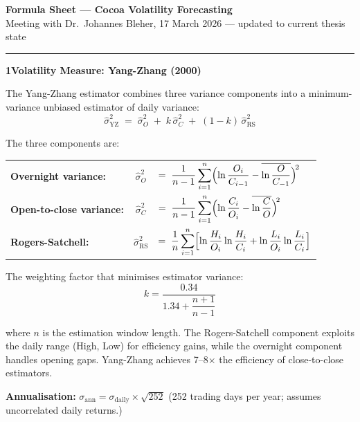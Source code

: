 \documentclass[10pt,a4paper]{article}
\newcommand{\sectionrule}{\vspace{0.3em}\hrule\vspace{0.5em}}
\begin{document}
\begin{center}
{\Large\bfseries Formula Sheet --- Cocoa Volatility Forecasting}\\[0.3em]
{\normalsize Meeting with Dr.\ Johannes Bleher, 17 March 2026 --- updated to current thesis state}
\end{center}

\sectionrule

\textbf{1\quad Volatility Measure: Yang-Zhang (2000)}

The Yang-Zhang estimator combines three variance components into a
minimum-variance unbiased estimator of daily variance:
\begin{equation*}
\hat{\sigma}^2_{\text{YZ}} \;=\; \hat{\sigma}^2_O \;+\; k\,\hat{\sigma}^2_C \;+\; (1-k)\,\hat{\sigma}^2_{\text{RS}}
\end{equation*}

The three components are:

\begin{tabular}{@{}lcl@{}}
\textbf{Overnight variance:} & $\hat{\sigma}^2_O$ &$= \;\displaystyle\frac{1}{n-1}\sum_{i=1}^{n}\Bigl(\ln\frac{O_i}{C_{i-1}} - \overline{\ln\frac{O}{C_{-1}}}\Bigr)^{\!2}$ \\[12pt]
\textbf{Open-to-close variance:} & $\hat{\sigma}^2_C$ &$= \;\displaystyle\frac{1}{n-1}\sum_{i=1}^{n}\Bigl(\ln\frac{C_i}{O_i} - \overline{\ln\frac{C}{O}}\Bigr)^{\!2}$ \\[12pt]
\textbf{Rogers-Satchell:} & $\hat{\sigma}^2_{\text{RS}}$ &$= \;\displaystyle\frac{1}{n}\sum_{i=1}^{n}\Bigl[\ln\frac{H_i}{O_i}\ln\frac{H_i}{C_i} + \ln\frac{L_i}{O_i}\ln\frac{L_i}{C_i}\Bigr]$
\end{tabular}

\medskip
The weighting factor that minimises estimator variance:
\begin{equation*}
k = \frac{0.34}{1.34 + \dfrac{n+1}{n-1}}
\end{equation*}

where $n$ is the estimation window length. The Rogers-Satchell component
exploits the daily range (High, Low) for efficiency gains, while the
overnight component handles opening gaps. Yang-Zhang achieves 7--8$\times$
the efficiency of close-to-close estimators.

\textbf{Annualisation:}\quad
$\sigma_{\text{ann}} = \sigma_{\text{daily}} \times \sqrt{252}$\qquad
(252 trading days per year; assumes uncorrelated daily returns.)
\end{document}
